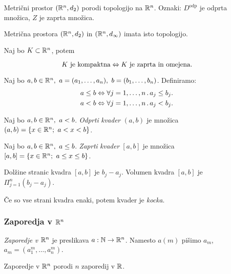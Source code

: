 Metrični prostor $(\mathbb{R}^n, d_2)$ porodi topologijo na $\mathbb{R}^n$. Oznaki: $D^\text{odp}$ je odprta množica, $Z$ je zaprta množica.

\begin{opomba}
    Metrična prostora $(\mathbb{R}^n, d_2)$ in $(\mathbb{R}^n, d_\infty)$ imata isto topologijo.
\end{opomba}

\begin{izrek}
    Naj bo $K \subset \mathbb{R}^n$, potem

    $$K \text{ je kompaktna} \Leftrightarrow K \text{ je zaprta in omejena}.$$
\end{izrek}

\begin{definicija}
    Naj bo $a, b \in \mathbb{R}^n, \ a = (a_1, \ldots, a_n), \ b= (b_1, \ldots, b_n)$. Definiramo:
    \begin{align*}
        a \leq b \Leftrightarrow \forall j = 1, \ldots, n \,.\, a_j \leq b_j. \\
        a < b \Leftrightarrow \forall j = 1, \ldots, n \,.\, a_j < b_j.
    \end{align*}
\end{definicija}

\begin{definicija}
    Naj bo $a, b \in \mathbb{R}^n, \ a< b$. \emph{Odprti kvader $(a,b)$} je množica $(a,b) = \set{x \in \RR^n; \ a<x<b}$.

    Naj bo $a, b \in \mathbb{R}^n, \ a \leq b$. \emph{Zaprti kvader $[a,b]$} je množica $[a,b] = \left\{x \in \mathbb{R}^n; \ a \leq x \leq b\right\}$.
\end{definicija}

\begin{opomba}
    Dolžine stranic kvadra $[a,b]$ je $b_j-a_j$. Volumen kvadra $[a,b]$ je $\Pi_{j=1}^n(b_j-a_j)$. 
    
    Če so vse strani kvadra enaki, potem kvader je \emph{kocka}.
\end{opomba}

\subsubsection{Zaporedja v $\mathbb{R}^n$}
\begin{definicija}
    \emph{Zaporedje v $\mathbb{R}^n$} je preslikava $a: \mathbb{N} \to \mathbb{R}^n$. Namesto $a(m)$ pišimo $a_m$, $a_m = (a_1^m, \ldots, a_n^m)$.
\end{definicija}

\begin{opomba}
    Zaporedje v $\mathbb{R}^n$ porodi $n$ zaporedij v $\mathbb{R}$.
\end{opomba}

